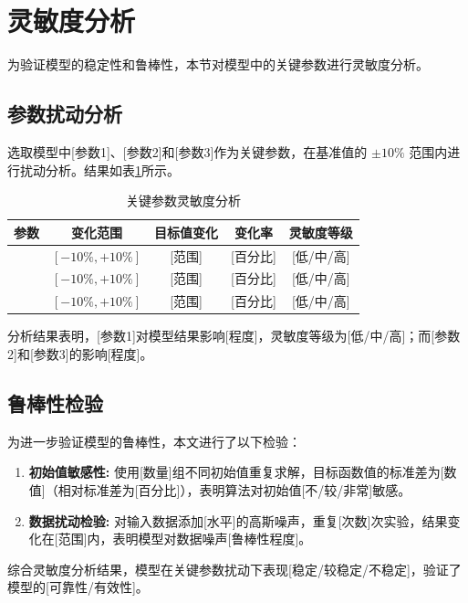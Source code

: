 
\section{灵敏度分析}

为验证模型的稳定性和鲁棒性，本节对模型中的关键参数进行灵敏度分析。

\subsection{参数扰动分析}

选取模型中[参数1]、[参数2]和[参数3]作为关键参数，在基准值的 $\pm 10\%$ 范围内进行扰动分析。结果如表\ref{tab:sensitivity}所示。

\begin{table}[H]
    \centering
    \caption{关键参数灵敏度分析}
    \label{tab:sensitivity}
    \begin{tabular}{ccccc}
        \toprule
        \textbf{参数} & \textbf{变化范围} & \textbf{目标值变化} & \textbf{变化率} & \textbf{灵敏度等级} \\
        \midrule
        [参数1] & $[-10\%, +10\%]$ & [范围] & [百分比] & [低/中/高] \\
        [参数2] & $[-10\%, +10\%]$ & [范围] & [百分比] & [低/中/高] \\
        [参数3] & $[-10\%, +10\%]$ & [范围] & [百分比] & [低/中/高] \\
        \bottomrule
    \end{tabular}
\end{table}

分析结果表明，[参数1]对模型结果影响[程度]，灵敏度等级为[低/中/高]；而[参数2]和[参数3]的影响[程度]。

\subsection{鲁棒性检验}

为进一步验证模型的鲁棒性，本文进行了以下检验：

\begin{enumerate}
    \item \textbf{初始值敏感性:} 使用[数量]组不同初始值重复求解，目标函数值的标准差为[数值]（相对标准差为[百分比]），表明算法对初始值[不/较/非常]敏感。
    \item \textbf{数据扰动检验:} 对输入数据添加[水平]的高斯噪声，重复[次数]次实验，结果变化在[范围]内，表明模型对数据噪声[鲁棒性程度]。
\end{enumerate}

综合灵敏度分析结果，模型在关键参数扰动下表现[稳定/较稳定/不稳定]，验证了模型的[可靠性/有效性]。
